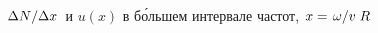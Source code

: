 \documentclass[compress]{beamer}
\begin{document}
    \begin{frame}

        \begin{figure}[h]
            \centering
            \hspace{8pt}%
            \hspace{8pt}%
            \caption[]{$\flatfrac{\Delta N}{\Delta x}$ и $u(x)$ в б\'{о}льшем интервале частот, $x = \flatfrac{\omega}{v} R$}
        \end{figure}

    \end{frame}

\end{document}
